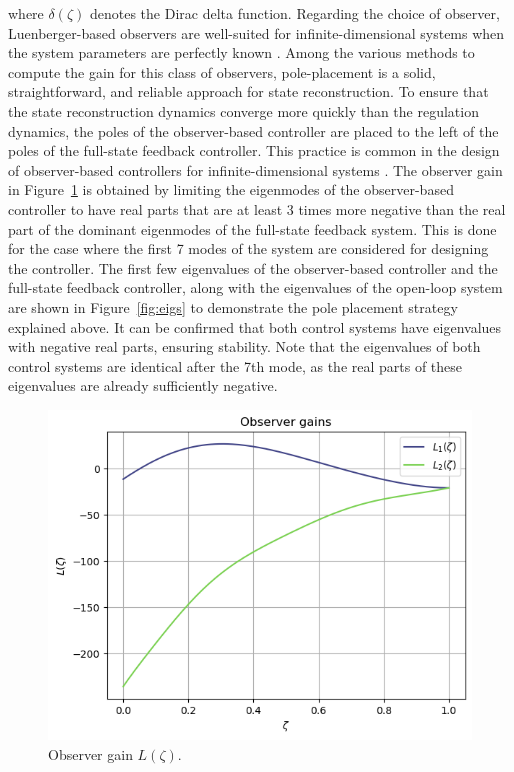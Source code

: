 where $\delta(\zeta)$ denotes the Dirac delta function. Regarding the choice of observer, Luenberger-based observers are well-suited for infinite-dimensional systems when the system parameters are perfectly known \autocite{ali2015reviewobserver}. Among the various methods to compute the gain for this class of observers, pole-placement is a solid, straightforward, and reliable approach for state reconstruction. To ensure that the state reconstruction dynamics converge more quickly than the regulation dynamics, the poles of the observer-based controller are placed to the left of the poles of the full-state feedback controller. This practice is common in the design of observer-based controllers for infinite-dimensional systems \autocite{morrisbook}. The observer gain in Figure~\ref{fig:L_modes} is obtained by limiting the eigenmodes of the observer-based controller to have real parts that are at least 3 times more negative than the real part of the dominant eigenmodes of the full-state feedback system. This is done for the case where the first 7 modes of the system are considered for designing the controller. The first few eigenvalues of the observer-based controller and the full-state feedback controller, along with the eigenvalues of the open-loop system are shown in Figure~\ref{fig:eigs} to demonstrate the pole placement strategy explained above. It can be confirmed that both control systems have eigenvalues with negative real parts, ensuring stability. Note that the eigenvalues of both control systems are identical after the 7th mode, as the real parts of these eigenvalues are already sufficiently negative.

\begin{figure}[H]
    \centering
    \includegraphics[width=\textwidth]{Figures/L.png}
    \caption{Observer gain $L(\zeta)$.}
    \label{fig:L_modes}
\end{figure}

